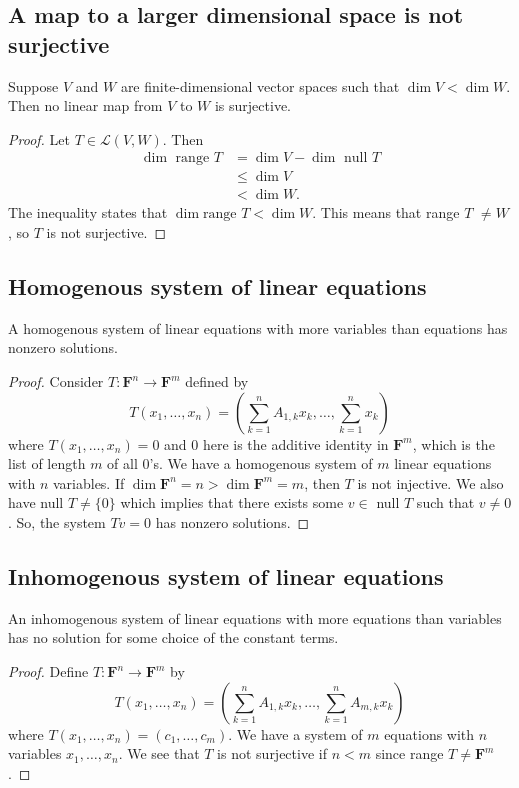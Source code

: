 \documentclass[11pt]{article}
\begin{document}
    \subsection{A map to a larger dimensional space is not surjective}

    Suppose $V$ and $W$ are finite-dimensional vector spaces such that \(\dim V < \dim W\). Then no linear map from $V$ to $W$ is surjective.

    \begin{proof}
        Let \(T \in \mathcal{L}(V,W)\). Then 
        \begin{align*}
            \dim \text{ range } T &= \dim V - \dim \text{ null } T \\
                                  &\leq \dim V \\
                                  &< \dim W.
        \end{align*}
        The inequality states that \(\dim \text{range } T < \dim W\). This means that range $T$ \(\neq W\), so $T$ is not surjective. 
    \end{proof}

    \subsection{Homogenous system of linear equations}
    
    A homogenous system of linear equations with more variables than equations has nonzero solutions. 

    \begin{proof}
        Consider \(T: \textbf{F}^n \rightarrow \textbf{F}^m\) defined by \[T(x_1, \dots, x_n) = \left( \sum_{k=1}^{n} A_{1,k} x_k, \dots, \sum_{k=1}^{n} x_k \right)\] where \(T(x_1, \dots, x_n) = 0\) and 0 here is the additive identity in \(\textbf{F}^m\), which is the list of length $m$ of all 0's. We have a homogenous system of $m$ linear equations with $n$ variables. If \(\dim \textbf{F}^n = n > \dim \textbf{F}^m = m\), then $T$ is not injective. We also have null \(T \neq \{0\}\) which implies that there exists some \(v \in\) null $T$ such that \(v \neq 0\). So, the system \(Tv = 0\) has nonzero solutions. 
    \end{proof}

    \subsection{Inhomogenous system of linear equations}

    An inhomogenous system of linear equations with more equations than variables has no solution for some choice of the constant terms.

    \begin{proof}
        Define \(T: \textbf{F}^n \rightarrow \textbf{F}^m\) by \[T(x_1, \dots, x_n) = \left( \sum_{k=1}^{n} A_{1,k} x_k, \dots, \sum_{k=1}^{n} A_{m,k} x_k \right)\] where \(T(x_1, \dots, x_n) = (c_1, \dots, c_m)\). We have a system of $m$ equations with $n$ variables \(x_1, \dots, x_n\). We see that $T$ is not surjective if \(n < m\) since range \(T \neq \textbf{F}^m\).
    \end{proof}
\end{document}
